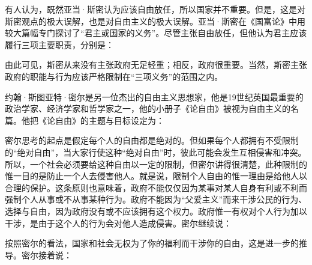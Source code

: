 有人认为，既然亚当·斯密认为应该自由放任，所以国家并不重要。但是，这是对斯密观点的极大误解，也是对自由主义的极大误解。亚当·斯密在《国富论》中用较大篇幅专门探讨了“君主或国家的义务”。尽管主张自由放任，但他认为君主应该履行三项主要职责，分别是：


由此可见，斯密从来没有主张政府无足轻重；相反，政府很重要。当然，斯密主张政府的职能与行为应该严格限制在“三项义务”的范围之内。

约翰·斯图亚特·密尔是另一位杰出的自由主义思想家，他是19世纪英国最重要的政治学家、经济学家和哲学家之一，他的小册子《论自由》被视为自由主义的名篇。他把《论自由》的主题与目标设定为：


密尔思考的起点是假定每个人的自由都是绝对的。但如果每个人都拥有不受限制的“绝对自由”，当大家行使这种“绝对自由”时，彼此可能会发生互相侵害和冲突。所以，一个社会必须要给这种自由以一定的限制，但密尔讲得很清楚，此种限制的惟一目的是防止一个人去侵害他人。就是说，限制个人自由的惟一理由是给他人以合理的保护。这条原则也意味着，政府不能仅仅因为某事对某人自身有利或不利而强制个人从事或不从事某种行为。政府不能因为“父爱主义”而来干涉公民的行为、选择与自由，因为政府没有或不应该拥有这个权力。政府惟一有权对个人行为加以干涉，是由于这个人的行为会对他人造成侵害。密尔继续说：


按照密尔的看法，国家和社会无权为了你的福利而干涉你的自由，这是进一步的推导。密尔接着说：



